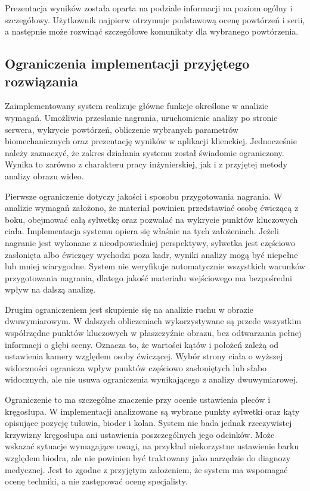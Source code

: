 Prezentacja wyników została oparta na podziale informacji na poziom ogólny i szczegółowy. Użytkownik najpierw otrzymuje podstawową ocenę powtórzeń i serii, a następnie może rozwinąć szczegółowe komunikaty dla wybranego powtórzenia.

\subsection{Ograniczenia implementacji przyjętego rozwiązania}

Zaimplementowany system realizuje główne funkcje określone w analizie wymagań. Umożliwia przesłanie nagrania, uruchomienie analizy po stronie serwera, wykrycie powtórzeń, obliczenie wybranych parametrów biomechanicznych oraz prezentację wyników w aplikacji klienckiej. Jednocześnie należy zaznaczyć, że zakres działania systemu został świadomie ograniczony. Wynika to zarówno z charakteru pracy inżynierskiej, jak i z przyjętej metody analizy obrazu wideo.

Pierwsze ograniczenie dotyczy jakości i sposobu przygotowania nagrania. W analizie wymagań założono, że materiał powinien przedstawiać osobę ćwiczącą z boku, obejmować całą sylwetkę oraz pozwalać na wykrycie punktów kluczowych ciała. Implementacja systemu opiera się właśnie na tych założeniach. Jeżeli nagranie jest wykonane z nieodpowiedniej perspektywy, sylwetka jest częściowo zasłonięta albo ćwiczący wychodzi poza kadr, wyniki analizy mogą być niepełne lub mniej wiarygodne. System nie weryfikuje automatycznie wszystkich warunków przygotowania nagrania, dlatego jakość materiału wejściowego ma bezpośredni wpływ na dalszą analizę.

Drugim ograniczeniem jest skupienie się na analizie ruchu w obrazie dwuwymiarowym. W dalszych obliczeniach wykorzystywane są przede wszystkim współrzędne punktów kluczowych w płaszczyźnie obrazu, bez odtwarzania pełnej informacji o głębi sceny. Oznacza to, że wartości kątów i położeń zależą od ustawienia kamery względem osoby ćwiczącej. Wybór strony ciała o wyższej widoczności ogranicza wpływ punktów częściowo zasłoniętych lub słabo widocznych, ale nie usuwa ograniczenia wynikającego z analizy dwuwymiarowej.

Ograniczenie to ma szczególne znaczenie przy ocenie ustawienia pleców i kręgosłupa. W implementacji analizowane są wybrane punkty sylwetki oraz kąty opisujące pozycję tułowia, bioder i kolan. System nie bada jednak rzeczywistej krzywizny kręgosłupa ani ustawienia poszczególnych jego odcinków. Może wskazać sytuacje wymagające uwagi, na przykład niekorzystne ustawienie barku względem biodra, ale nie powinien być traktowany jako narzędzie do diagnozy medycznej. Jest to zgodne z przyjętym założeniem, że system ma wspomagać ocenę techniki, a nie zastępować ocenę specjalisty.


